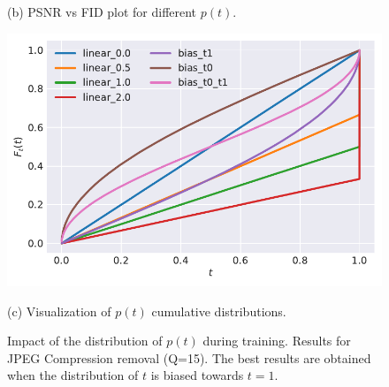 \begin{figure}[t]
\begin{minipage}[c]{.47\textwidth}
    (b) PSNR vs FID plot for different $p(t)$.
    \end{minipage}
    \begin{minipage}[c]{.47\textwidth}
    \centering\small
    \includegraphics[width=0.9\linewidth]{assets/pd_curve_dejpeg_q15_distro_t.pdf}
    
    (c) Visualization of $p(t)$ cumulative distributions.
    \end{minipage}
    

    \caption{Impact of the distribution of $p(t)$ during training. Results for JPEG Compression removal (Q=15). The best results are obtained when the distribution of $t$ is biased towards $t=1$.}
    \label{fig:dejpeg_distribution_t}
\end{figure}